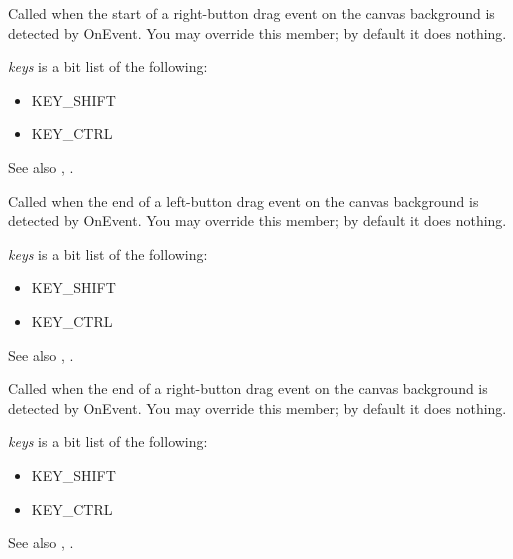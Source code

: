 Called when the start of a right-button drag event on the canvas background is detected by OnEvent. You may override this member;
by default it does nothing.

{\it keys} is a bit list of the following:

\begin{itemize}\itemsep=0pt
\item KEY\_SHIFT
\item KEY\_CTRL
\end{itemize}

See also , .

\label{wxshapecanvasonenddragleft}


Called when the end of a left-button drag event on the canvas background is detected by OnEvent. You may override this member;
by default it does nothing.

{\it keys} is a bit list of the following:

\begin{itemize}\itemsep=0pt
\item KEY\_SHIFT
\item KEY\_CTRL
\end{itemize}

See also , .

\label{wxshapecanvasonenddragright}


Called when the end of a right-button drag event on the canvas background is detected by OnEvent. You may override this member;
by default it does nothing.

{\it keys} is a bit list of the following:

\begin{itemize}\itemsep=0pt
\item KEY\_SHIFT
\item KEY\_CTRL
\end{itemize}

See also , .

